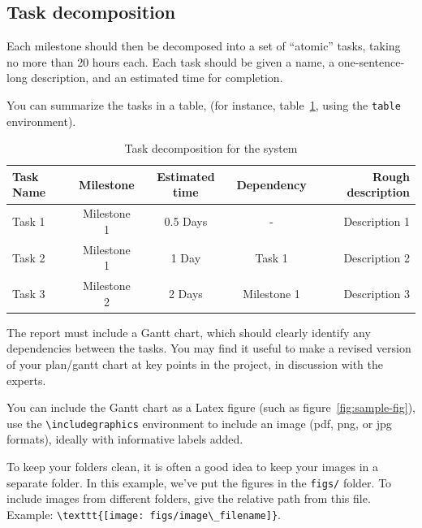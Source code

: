 \documentclass{article}
\begin{document}
\subsection{Task decomposition} 
Each milestone should then be decomposed into a set of ``atomic'' tasks, taking no more than 20 hours each. Each task should be given a name, a one-sentence-long description, and an estimated time for completion.


You can summarize the tasks in a table, (for instance, table~\ref{tab:sample-table}, using the \verb+table+ environment).

\begin{table}[h]
\vskip 3mm
\begin{center}
\begin{small}
\begin{sc}
\begin{tabular}{lcccr}
\hline
\abovespace\belowspace
Task Name & Milestone  & Estimated time & Dependency &  Rough description \\
\hline
\abovespace
Task 1 & Milestone 1    & 0.5 Days & - & Description 1 \\
Task 2 & Milestone 1    & 1 Day  & Task 1 & Description 2 \\
Task 3 & Milestone 2    & 2 Days & Milestone 1 & Description 3 
\belowspace
\end{tabular}
\end{sc}
\end{small}
\caption{Task decomposition for the system}
\label{tab:sample-table}
\end{center}
\vskip -3mm
\end{table}

The report must include a Gantt chart, which should clearly identify any dependencies between the tasks. You may find it useful to make a revised version of your plan/gantt chart at key points in the project, in discussion with the experts. 

You can include the Gantt chart as a Latex figure (such as figure~\ref{fig:sample-fig}), use the \verb+\includegraphics+ environment to include an image (pdf, png, or jpg formats), ideally with informative labels added. 

To keep your folders clean, it is often a good idea to keep your images in a separate folder. In this example, we've put the figures in the \texttt{figs/} folder. To include images from different folders, give the relative path from this file. Example: \verb+\texttt{[image: figs/image\_filename]}+.
\end{document}
